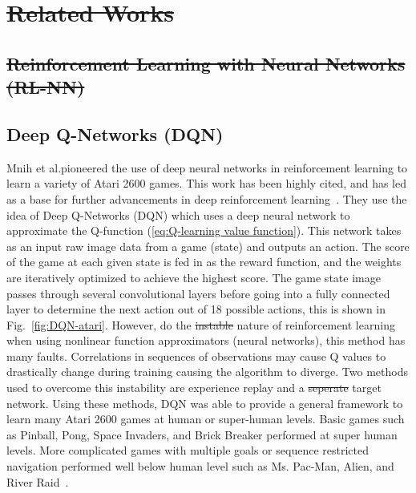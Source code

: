 \documentclass[12pt,american]{report}
\providecommand{\DIFaddtex}[1]{{\protect\color{blue}\uwave{#1}}} %
\providecommand{\DIFdeltex}[1]{{\protect\color{red}\sout{#1}}}                      %
\providecommand{\DIFaddbegin}{} %
\providecommand{\DIFaddend}{} %
\providecommand{\DIFdelbegin}{} %
\providecommand{\DIFdelend}{} %
\providecommand{\DIFadd}[1]{\texorpdfstring{\DIFaddtex{#1}}{#1}} %
\providecommand{\DIFdel}[1]{\texorpdfstring{\DIFdeltex{#1}}{}} %
\newcommand{\DIFscaledelfig}{0.5}
\newlength{\DIFdelgraphicswidth} %
\newlength{\DIFdelgraphicsheight} %
\newcommand{\DIFaddincludegraphics}[2][]{{\color{blue}\fbox{\DIFOincludegraphics[#1]{#2}}}} %
\newcommand{\DIFdelincludegraphics}[2][]{%
\sbox{\DIFdelgraphicsbox}{\DIFOincludegraphics[#1]{#2}}%
\settoboxwidth{\DIFdelgraphicswidth}{\DIFdelgraphicsbox} %
\settoboxtotalheight{\DIFdelgraphicsheight}{\DIFdelgraphicsbox} %
\scalebox{\DIFscaledelfig}{%
\parbox[b]{\DIFdelgraphicswidth}{\usebox{\DIFdelgraphicsbox}\\[-\baselineskip] \rule{\DIFdelgraphicswidth}{0em}}\llap{\resizebox{\DIFdelgraphicswidth}{\DIFdelgraphicsheight}{%
\setlength{\unitlength}{\DIFdelgraphicswidth}%
\begin{picture}(1,1)%
\thicklines\linethickness{2pt} %
{\color[rgb]{1,0,0}\put(0,0){\framebox(1,1){}}}%
{\color[rgb]{1,0,0}\put(0,0){\line( 1,1){1}}}%
{\color[rgb]{1,0,0}\put(0,1){\line(1,-1){1}}}%
\end{picture}%
}\hspace*{3pt}}} %
} %
\DeclareRobustCommand{\DIFaddbegin}{\DIFOaddbegin \let\includegraphics\DIFaddincludegraphics} %
\DeclareRobustCommand{\DIFaddend}{\DIFOaddend \let\includegraphics\DIFOincludegraphics} %
\DeclareRobustCommand{\DIFdelbegin}{\DIFOdelbegin \let\includegraphics\DIFdelincludegraphics} %
\DeclareRobustCommand{\DIFdelend}{\DIFOaddend \let\includegraphics\DIFOincludegraphics} %
\begin{document}
\DIFdelbegin \section{\DIFdel{Related Works}}
\addtocounter{section}{-1}%

\subsection{\DIFdel{Reinforcement Learning with Neural Networks (RL-NN)}}
\addtocounter{subsection}{-1}%

\DIFdelend \subsection{Deep Q-Networks (DQN)}
\DIFdelbegin %

\DIFdelend \DIFaddbegin \label{sec:dqn}
\DIFaddend Mnih et al.\DIFaddbegin \DIFadd{~\mbox{%
\cite{atari} }%
}\DIFaddend pioneered the use of deep neural networks in reinforcement learning to learn a variety of Atari 2600 games.  This work has been highly cited, and has led as a base for further advancements in deep reinforcement learning~\cite{atari}.  They use the idea of Deep Q-Networks (DQN) which uses a deep neural network to approximate the Q-function (\ref{eq:Q-learning value function}). This network takes as an input raw image data from a game (state) and outputs an action. The score of the game at each given state is fed in as the reward function, and the weights are iteratively optimized to achieve the highest score. The game state image passes through several convolutional layers before going into a fully connected layer to determine the next action out of 18 possible actions, this is shown in Fig.~\ref{fig:DQN-atari}. However, do the \DIFdelbegin \DIFdel{instable }\DIFdelend \DIFaddbegin \DIFadd{unstable }\DIFaddend nature of reinforcement learning when using nonlinear function approximators (neural networks), this method has many faults. Correlations in sequences of observations may cause Q values to drastically change during training causing the algorithm to diverge. Two methods used to overcome this instability are experience replay and a \DIFdelbegin \DIFdel{seperate }\DIFdelend \DIFaddbegin \DIFadd{separate }\DIFaddend target network. Using these methods, DQN was able to provide a general framework to learn many Atari 2600 games at human or super-human levels. Basic games such as Pinball, Pong, Space Invaders, and Brick Breaker performed at super human levels. More complicated games with multiple goals or sequence restricted navigation performed well below human level such as Ms. Pac-Man, Alien, and River Raid~\cite{atari}.
\end{document}
